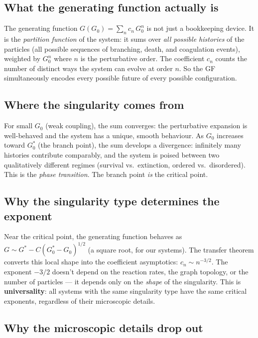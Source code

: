 \documentclass[11pt,a4paper]{article}
\theoremstyle{definition}
\begin{document}
\subsection{What the generating function actually is}

The generating function $G(G_0) = \sum_n c_n\, G_0^n$ is not just a
bookkeeping device. It is the \emph{partition function} of the system:
it sums over \emph{all possible histories} of the particles (all
possible sequences of branching, death, and coagulation events),
weighted by $G_0^n$ where $n$ is the perturbative order. The coefficient
$c_n$ counts the number of distinct ways the system can evolve at order
$n$. So the GF simultaneously encodes every possible future of every
possible configuration.

\subsection{Where the singularity comes from}

For small $G_0$ (weak coupling), the sum converges: the perturbative
expansion is well-behaved and the system has a unique, smooth behaviour.
As $G_0$ increases toward $G_0^*$ (the branch point), the sum develops
a divergence: infinitely many histories contribute comparably, and the
system is poised between two qualitatively different regimes (survival
vs.\ extinction, ordered vs.\ disordered). This is the \emph{phase
transition}. The branch point \emph{is} the critical point.

\subsection{Why the singularity type determines the exponent}

Near the critical point, the generating function behaves as
$G \sim G^* - C(G_0^* - G_0)^{1/2}$ (a square root, for our systems).
The transfer theorem converts this local shape into the coefficient
asymptotics: $c_n \sim n^{-3/2}$. The exponent $-3/2$ doesn't depend
on the reaction rates, the graph topology, or the number of particles
--- it depends only on the \emph{shape} of the singularity. This is
\textbf{universality}: all systems with the same singularity type have
the same critical exponents, regardless of their microscopic details.

\subsection{Why the microscopic details drop out}
\end{document}
